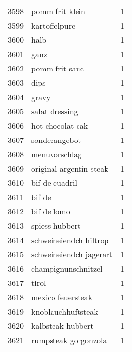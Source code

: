 \begin{tabular}{llr}
3598 &                                    pomm frit klein &      1 \\
3599 &                                      kartoffelpure &      1 \\
3600 &                                               halb &      1 \\
3601 &                                               ganz &      1 \\
3602 &                                     pomm frit sauc &      1 \\
3603 &                                               dips &      1 \\
3604 &                                              gravy &      1 \\
3605 &                                     salat dressing &      1 \\
3606 &                                   hot chocolat cak &      1 \\
3607 &                                      sonderangebot &      1 \\
3608 &                                      menuvorschlag &      1 \\
3609 &                            original argentin steak &      1 \\
3610 &                                     bif de cuadril &      1 \\
3611 &                                             bif de &      1 \\
3612 &                                        bif de lomo &      1 \\
3613 &                                     spiess hubbert &      1 \\
3614 &                             schweineiendch hiltrop &      1 \\
3615 &                            schweineiendch jagerart &      1 \\
3616 &                                champignunschnitzel &      1 \\
3617 &                                              tirol &      1 \\
3618 &                                  mexico feuersteak &      1 \\
3619 &                                 knoblauchhuftsteak &      1 \\
3620 &                                  kalbsteak hubbert &      1 \\
3621 &                               rumpsteak gorgonzola &      1 \\

\end{tabular}
